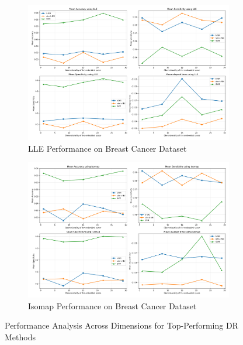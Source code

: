 \documentclass[12pt,a4paper]{article}
\begin{document}
\begin{figure}[H]
    \begin{subfigure}[b]{0.48\textwidth}
        \includegraphics[width=\textwidth]{../python/results/plots/Mean_Results_LLE_Data_BreastCancer.pdf}
        \caption{LLE Performance on Breast Cancer Dataset}
        \label{fig:lle_breast}
    \end{subfigure}
    \hfill
    \begin{subfigure}[b]{0.48\textwidth}
        \includegraphics[width=\textwidth]{../python/results/plots/Mean_Results_Isomap_Data_BreastCancer.pdf}
        \caption{Isomap Performance on Breast Cancer Dataset}
        \label{fig:isomap_breast}
    \end{subfigure}
    
    \caption{Performance Analysis Across Dimensions for Top-Performing DR Methods}
    \label{fig:dimensional_analysis}
\end{figure}
\end{document}
